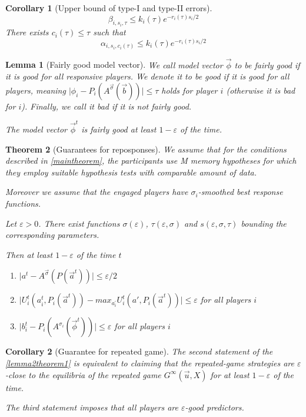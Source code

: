 \documentclass[]{spie}  %
\newtheorem{theorem}{Theorem}
\newtheorem{corollary}{Corollary}[theorem]
\newtheorem{lemma}[theorem]{Lemma}
\begin{document}
\begin{corollary}[Upper bound of type-I and type-II errors]
$$ \beta_{i,s_i,\tau} \leq k_i(\tau) e^{-r_i(\tau) s_i/2} $$
There exists $c_i(\tau) \leq \tau$ such that
$$ \alpha_{i,s_i,c_i(\tau)}  \leq k_i(\tau) e^{-r_i(\tau) s_i/2} $$
\end{corollary}

\begin{lemma}[Fairly good model vector]
\label{claim1}
We call model vector $\overrightarrow{\phi}$ to be fairly good if it is good for all responsive players. We denote it to be good if it is good for all players, meaning $\lvert \phi_i - P_i(A^{\overrightarrow{\sigma}} (\overrightarrow{b})) \rvert \leq \tau$ holds for player $i$ (otherwise it is bad for $i$). Finally, we call it bad if it is not fairly good.

The model vector $\overrightarrow{\phi}^t$ is fairly good at least $1-\varepsilon$ of the time.
\end{lemma}


\begin{theorem}[Guarantees for reposponses]
\label{lemma2theorem1}
We assume that for the conditions described in \autoref{maintheorem}, the participants use M memory hypotheses for which they employ suitable hypothesis tests with comparable amount of data. 

Moreover we assume that the engaged players have $\sigma_i$-smoothed best response functions.

Let $\varepsilon > 0$. There exist functions $\sigma(\varepsilon)$, $\tau(\varepsilon, \sigma)$ and $s(\varepsilon, \sigma, \tau)$ bounding the corresponding parameters.

Then at least $1 - \varepsilon$ of the time $t$
\begin{enumerate}[I]
    \item $ \lvert a^t - A^{\overrightarrow{\sigma}} (P (\overrightarrow{a}^t)) \rvert \leq \varepsilon / 2$
    \item $ \lvert U_i^t (a_i^t, P_i(\overrightarrow{a}^t)) - max_{a^{'}_i} U_i^t(a', P_i(\overrightarrow{a}^t)) \rvert \leq \varepsilon$ for all players $i$
    \item $ \lvert b_i^t - P_i(A^{\sigma_i}(\overrightarrow{\phi}^t)) \rvert \leq \varepsilon $ for all players $i$
\end{enumerate}
\end{theorem}

\begin{corollary}[Guarantee for repeated game]
The second statement of the \autoref{lemma2theorem1} is equivalent to claiming that the repeated-game strategies are $\varepsilon$-close to the equilibria of the repeated game $G^{\infty}(\overrightarrow{u}, X)$ for at least $1 - \varepsilon$ of the time.

The third statement imposes that all players are $\varepsilon$-good predictors.

\end{corollary}
\end{document}
